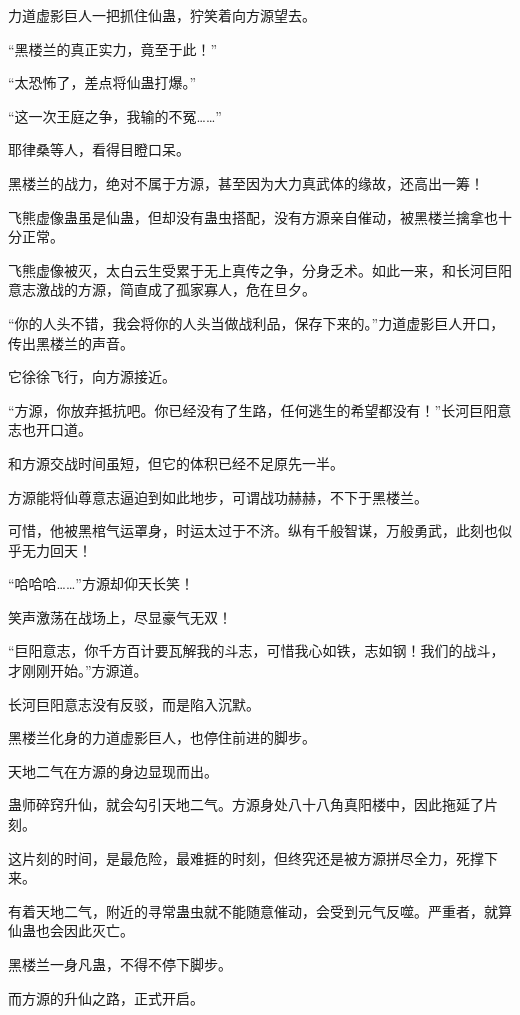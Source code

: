 \begin{this_body}
力道虚影巨人一把抓住仙蛊，狞笑着向方源望去。

“黑楼兰的真正实力，竟至于此！”

“太恐怖了，差点将仙蛊打爆。”

“这一次王庭之争，我输的不冤……”

耶律桑等人，看得目瞪口呆。

黑楼兰的战力，绝对不属于方源，甚至因为大力真武体的缘故，还高出一筹！

飞熊虚像蛊虽是仙蛊，但却没有蛊虫搭配，没有方源亲自催动，被黑楼兰擒拿也十分正常。

飞熊虚像被灭，太白云生受累于无上真传之争，分身乏术。如此一来，和长河巨阳意志激战的方源，简直成了孤家寡人，危在旦夕。

“你的人头不错，我会将你的人头当做战利品，保存下来的。”力道虚影巨人开口，传出黑楼兰的声音。

它徐徐飞行，向方源接近。

“方源，你放弃抵抗吧。你已经没有了生路，任何逃生的希望都没有！”长河巨阳意志也开口道。

和方源交战时间虽短，但它的体积已经不足原先一半。

方源能将仙尊意志逼迫到如此地步，可谓战功赫赫，不下于黑楼兰。

可惜，他被黑棺气运罩身，时运太过于不济。纵有千般智谋，万般勇武，此刻也似乎无力回天！

“哈哈哈……”方源却仰天长笑！

笑声激荡在战场上，尽显豪气无双！

“巨阳意志，你千方百计要瓦解我的斗志，可惜我心如铁，志如钢！我们的战斗，才刚刚开始。”方源道。

长河巨阳意志没有反驳，而是陷入沉默。

黑楼兰化身的力道虚影巨人，也停住前进的脚步。

天地二气在方源的身边显现而出。

蛊师碎窍升仙，就会勾引天地二气。方源身处八十八角真阳楼中，因此拖延了片刻。

这片刻的时间，是最危险，最难捱的时刻，但终究还是被方源拼尽全力，死撑下来。

有着天地二气，附近的寻常蛊虫就不能随意催动，会受到元气反噬。严重者，就算仙蛊也会因此灭亡。

黑楼兰一身凡蛊，不得不停下脚步。

而方源的升仙之路，正式开启。

\end{this_body}

